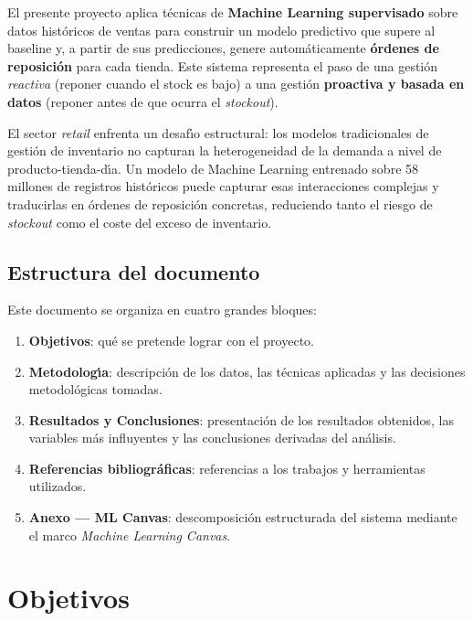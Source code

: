 \documentclass[12pt, a4paper, oneside]{report}
\begin{document}
El presente proyecto aplica t\'ecnicas de \textbf{Machine Learning supervisado} sobre datos hist\'oricos de ventas para construir un modelo predictivo que supere al baseline y, a partir de sus predicciones, genere autom\'aticamente \textbf{\'ordenes de reposici\'on} para cada tienda. Este sistema representa el paso de una gesti\'on \textit{reactiva} (reponer cuando el stock es bajo) a una gesti\'on \textbf{proactiva y basada en datos} (reponer antes de que ocurra el \textit{stockout}).

\begin{tcolorbox}[canvasbox, title={Motivaci\'on del proyecto}]
El sector \textit{retail} enfrenta un desaf\'{\i}o estructural: los modelos tradicionales de gesti\'on de inventario no capturan la heterogeneidad de la demanda a nivel de producto-tienda-d\'{\i}a. Un modelo de Machine Learning entrenado sobre 58 millones de registros hist\'oricos puede capturar esas interacciones complejas y traducirlas en \'ordenes de reposici\'on concretas, reduciendo tanto el riesgo de \textit{stockout} como el coste del exceso de inventario.
\end{tcolorbox}

\section{Estructura del documento}

Este documento se organiza en cuatro grandes bloques:

\begin{enumerate}[leftmargin=*, noitemsep]
  \item \textbf{Objetivos}: qu\'e se pretende lograr con el proyecto.
  \item \textbf{Metodolog\'{\i}a}: descripci\'on de los datos, las t\'ecnicas aplicadas y las decisiones metodol\'ogicas tomadas.
  \item \textbf{Resultados y Conclusiones}: presentaci\'on de los resultados obtenidos, las variables m\'as influyentes y las conclusiones derivadas del an\'alisis.
  \item \textbf{Referencias bibliogr\'aficas}: referencias a los trabajos y herramientas utilizados.
  \item \textbf{Anexo --- ML Canvas}: descomposici\'on estructurada del sistema mediante el marco \textit{Machine Learning Canvas}.
\end{enumerate}

\chapter{Objetivos}
\end{document}
